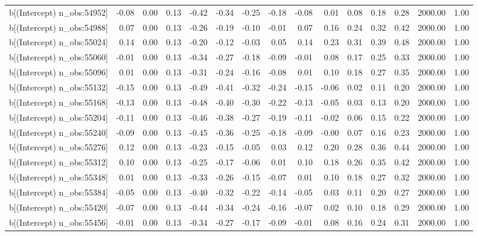 \begin{table}[ht]
\begin{tabular}{rrrrrrrrrrrrrrr}
  b[(Intercept) n\_obs:54952] & -0.08 & 0.00 & 0.13 & -0.42 & -0.34 & -0.25 & -0.18 & -0.08 & 0.01 & 0.08 & 0.18 & 0.28 & 2000.00 & 1.00 \\ 
  b[(Intercept) n\_obs:54988] & 0.07 & 0.00 & 0.13 & -0.26 & -0.19 & -0.10 & -0.01 & 0.07 & 0.16 & 0.24 & 0.32 & 0.42 & 2000.00 & 1.00 \\ 
  b[(Intercept) n\_obs:55024] & 0.14 & 0.00 & 0.13 & -0.20 & -0.12 & -0.03 & 0.05 & 0.14 & 0.23 & 0.31 & 0.39 & 0.48 & 2000.00 & 1.00 \\ 
  b[(Intercept) n\_obs:55060] & -0.01 & 0.00 & 0.13 & -0.34 & -0.27 & -0.18 & -0.09 & -0.01 & 0.08 & 0.17 & 0.25 & 0.33 & 2000.00 & 1.00 \\ 
  b[(Intercept) n\_obs:55096] & 0.01 & 0.00 & 0.13 & -0.31 & -0.24 & -0.16 & -0.08 & 0.01 & 0.10 & 0.18 & 0.27 & 0.35 & 2000.00 & 1.00 \\ 
  b[(Intercept) n\_obs:55132] & -0.15 & 0.00 & 0.13 & -0.49 & -0.41 & -0.32 & -0.24 & -0.15 & -0.06 & 0.02 & 0.11 & 0.20 & 2000.00 & 1.00 \\ 
  b[(Intercept) n\_obs:55168] & -0.13 & 0.00 & 0.13 & -0.48 & -0.40 & -0.30 & -0.22 & -0.13 & -0.05 & 0.03 & 0.13 & 0.20 & 2000.00 & 1.00 \\ 
  b[(Intercept) n\_obs:55204] & -0.11 & 0.00 & 0.13 & -0.46 & -0.38 & -0.27 & -0.19 & -0.11 & -0.02 & 0.06 & 0.15 & 0.22 & 2000.00 & 1.00 \\ 
  b[(Intercept) n\_obs:55240] & -0.09 & 0.00 & 0.13 & -0.45 & -0.36 & -0.25 & -0.18 & -0.09 & -0.00 & 0.07 & 0.16 & 0.23 & 2000.00 & 1.00 \\ 
  b[(Intercept) n\_obs:55276] & 0.12 & 0.00 & 0.13 & -0.23 & -0.15 & -0.05 & 0.03 & 0.12 & 0.20 & 0.28 & 0.36 & 0.44 & 2000.00 & 1.00 \\ 
  b[(Intercept) n\_obs:55312] & 0.10 & 0.00 & 0.13 & -0.25 & -0.17 & -0.06 & 0.01 & 0.10 & 0.18 & 0.26 & 0.35 & 0.42 & 2000.00 & 1.00 \\ 
  b[(Intercept) n\_obs:55348] & 0.01 & 0.00 & 0.13 & -0.33 & -0.26 & -0.15 & -0.07 & 0.01 & 0.10 & 0.18 & 0.27 & 0.32 & 2000.00 & 1.00 \\ 
  b[(Intercept) n\_obs:55384] & -0.05 & 0.00 & 0.13 & -0.40 & -0.32 & -0.22 & -0.14 & -0.05 & 0.03 & 0.11 & 0.20 & 0.27 & 2000.00 & 1.00 \\ 
  b[(Intercept) n\_obs:55420] & -0.07 & 0.00 & 0.13 & -0.44 & -0.34 & -0.24 & -0.16 & -0.07 & 0.02 & 0.10 & 0.18 & 0.29 & 2000.00 & 1.00 \\ 
  b[(Intercept) n\_obs:55456] & -0.01 & 0.00 & 0.13 & -0.34 & -0.27 & -0.17 & -0.09 & -0.01 & 0.08 & 0.16 & 0.24 & 0.31 & 2000.00 & 1.00 \\ 

\end{tabular}
\end{table}
